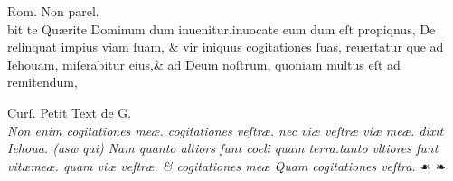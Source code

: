 \documentclass{article}
\begin{document}
{\begin{multicols}{4}
	\columnbreak

	\centering
	\tiny
	Rom. Non parel.\\
	\vspace{\baselineskip}
	\fontsize{3}{3}\selectfont
	\justifying
	\noindent bit te Qu\ae{}rite Dominum dum inuenitur,inuocate eum dum eſt propiqnus,\linebreak%
	De relinquat impius viam ſuam, \& vir iniquus cogitationes ſuas, reuertatur\linebreak%
	que ad Iehouam, miſerabitur eius,\& ad Deum noſtrum, quoniam multus eſt\linebreak%
	ad remitendum,
	\columnbreak

	\centering
	\tiny
	Curſ. Petit Text de G.\\
	\vspace{\baselineskip}
	\fontsize{4}{4.5}\selectfont
	\justifying
	\noindent \textit{Non enim cogitationes me\ae{}. cogitationes veſtr\ae{}. nec vi\ae{} veſtr\ae{} viæ \linebreak
		me\ae{}. dixit Iehoua. ({\grecs asw qai}) Nam quanto altiors ſunt coeli quam\linebreak
		terra.tanto vltiores ſunt vit\ae{}me\ae{}. quam vi\ae{} veſtr\ae{}. \& cogitationes\linebreak
		me\ae{} Quam {\normalfont cogitationes} veſtra.} \quad ☙ ❧

	\columnbreak


\end{multicols}}
\end{document}
